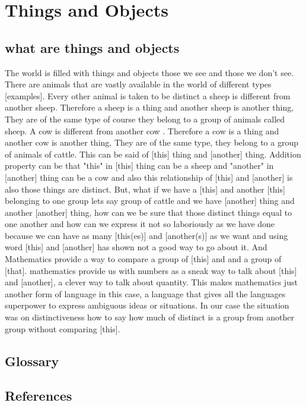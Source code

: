 \chapter{Things and Objects}%

\section{what are things and objects}
The world is filled with things and objects those we see and those we don't see. There are animals that are vastly available in the world of different types [examples]. Every other animal is taken to be distinct a sheep is different from another sheep. Therefore a sheep is a thing and another sheep is another thing, They are of the same type of course they belong to a group of animals called sheep. A cow is different from another cow . Therefore a cow is a thing and another cow is another thing, They are of the same type, they belong to a group of animals of cattle. This can be said of [this] thing and [another] thing. Addition property can be that "this" in [this] thing can be a sheep and "another" in [another] thing can be a cow and also this relationship of [this] and [another] is also those things are distinct. But, what if we have a [this] and another [this] belonging to one group lets say group of cattle and we have [another] thing and another [another] thing, how can we be sure that those distinct things equal to one another and how can we express it not so laboriously as we have done because we can have as many [this(es)] and [another(s)] as we want and using word [this] and [another] has shown not a good way to go about it. And Mathematics provide a way to compare a group of [this] and  and a group of [that]. mathematics provide us with numbers as a sneak way to talk about [this] and [another], a clever way to talk about quantity. This makes mathematics just another form of language in this case, a language that gives all the languages superpower to express ambiguous ideas or situations. In our case the situation was on distinctiveness how to say how much of distinct is a group from another group without comparing [this].

\section{Glossary}
\section{References}
